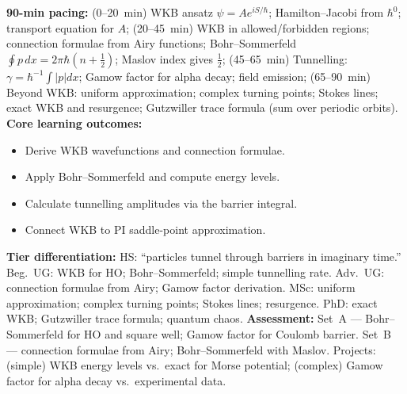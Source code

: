 \documentclass[11pt,a4paper]{article}
\begin{document}
\begin{tcolorbox}[modulebox, title={Module~II.2 / L04: Saddle-Point Approximation and WKB}]
\textbf{90-min pacing:} (0--20~min) WKB ansatz $\psi=A e^{iS/\hbar}$; Hamilton--Jacobi from $\hbar^0$; transport equation for $A$; (20--45~min) WKB in allowed/forbidden regions; connection formulae from Airy functions; Bohr--Sommerfeld $\oint p\,dx=2\pi\hbar(n+\tfrac{1}{2})$; Maslov index gives $\tfrac{1}{2}$; (45--65~min) Tunnelling: $\gamma=\hbar^{-1}\int|p|dx$; Gamow factor for alpha decay; field emission; (65--90~min) Beyond WKB: uniform approximation; complex turning points; Stokes lines; exact WKB and resurgence; Gutzwiller trace formula (sum over periodic orbits).
\medskip\textbf{Core learning outcomes:}
\begin{itemize}[leftmargin=1.4em,topsep=2pt,itemsep=1pt]
  \item Derive WKB wavefunctions and connection formulae.
  \item Apply Bohr--Sommerfeld and compute energy levels.
  \item Calculate tunnelling amplitudes via the barrier integral.
  \item Connect WKB to PI saddle-point approximation.
\end{itemize}
\medskip\textbf{Tier differentiation:}
HS: ``particles tunnel through barriers in imaginary time.''
Beg.\ UG: WKB for HO; Bohr--Sommerfeld; simple tunnelling rate.
Adv.\ UG: connection formulae from Airy; Gamow factor derivation.
MSc: uniform approximation; complex turning points; Stokes lines; resurgence.
PhD: exact WKB; Gutzwiller trace formula; quantum chaos.
\medskip\textbf{Assessment:}
Set~A --- Bohr--Sommerfeld for HO and square well; Gamow factor for Coulomb barrier.
Set~B --- connection formulae from Airy; Bohr--Sommerfeld with Maslov.
Projects: (simple) WKB energy levels vs.\ exact for Morse potential; (complex) Gamow factor for alpha decay vs.\ experimental data.
\end{tcolorbox}

\medskip
\end{document}
